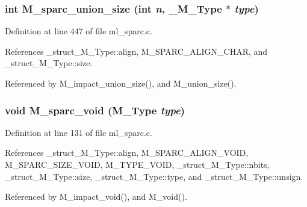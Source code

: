 \subsubsection{\setlength{\rightskip}{0pt plus 5cm}int M\_\-sparc\_\-union\_\-size (int {\em n}, \bf{\_\-M\_\-Type} $\ast$ {\em type})}\label{m__sparc_8h_4f771591d9066d35c1cc7e49553f4285}




Definition at line 447 of file ml\_\-sparc.c.

References \_\-struct\_\-M\_\-Type::align, M\_\-SPARC\_\-ALIGN\_\-CHAR, and \_\-struct\_\-M\_\-Type::size.

Referenced by M\_\-impact\_\-union\_\-size(), and M\_\-union\_\-size().
\subsubsection{\setlength{\rightskip}{0pt plus 5cm}void M\_\-sparc\_\-void (\bf{M\_\-Type} {\em type})}\label{m__sparc_8h_d2bd892fac17dc08374320f02bc6ebf4}




Definition at line 131 of file ml\_\-sparc.c.

References \_\-struct\_\-M\_\-Type::align, M\_\-SPARC\_\-ALIGN\_\-VOID, M\_\-SPARC\_\-SIZE\_\-VOID, M\_\-TYPE\_\-VOID, \_\-struct\_\-M\_\-Type::nbits, \_\-struct\_\-M\_\-Type::size, \_\-struct\_\-M\_\-Type::type, and \_\-struct\_\-M\_\-Type::unsign.

Referenced by M\_\-impact\_\-void(), and M\_\-void().